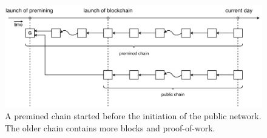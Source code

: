 \begin{figure}[hbt] \centering

    \includegraphics[width=12cm]{./images/premining_attack_bitcoin.pdf}

    \caption{ A premined chain started before the initiation of the public
    network. The older chain contains more blocks and proof-of-work.}

    \label{figure:premining_attack} \end{figure}

